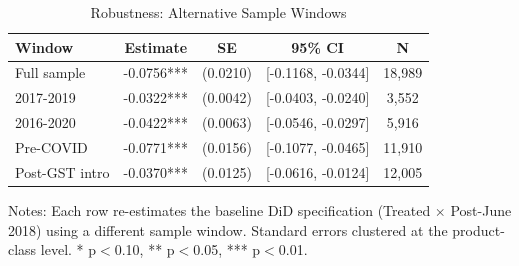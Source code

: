 \begin{table}[H]
\centering
\caption{Robustness: Alternative Sample Windows}
\label{tab:windows}
\begin{threeparttable}
\begin{tabular}{lcccc}
\toprule
Window & Estimate & SE & 95\% CI & N \\
\midrule
Full sample & -0.0756*** & (0.0210) & [-0.1168, -0.0344] & 18,989 \\
2017-2019 & -0.0322*** & (0.0042) & [-0.0403, -0.0240] & 3,552 \\
2016-2020 & -0.0422*** & (0.0063) & [-0.0546, -0.0297] & 5,916 \\
Pre-COVID & -0.0771*** & (0.0156) & [-0.1077, -0.0465] & 11,910 \\
Post-GST intro & -0.0370*** & (0.0125) & [-0.0616, -0.0124] & 12,005 \\
\bottomrule
\end{tabular}
\begin{tablenotes}[flushleft]
\small
\item Notes: Each row re-estimates the baseline DiD specification (Treated $\times$ Post-June 2018) using a different sample window. Standard errors clustered at the product-class level. * p$<$0.10, ** p$<$0.05, *** p$<$0.01.
\end{tablenotes}
\end{threeparttable}
\end{table}

